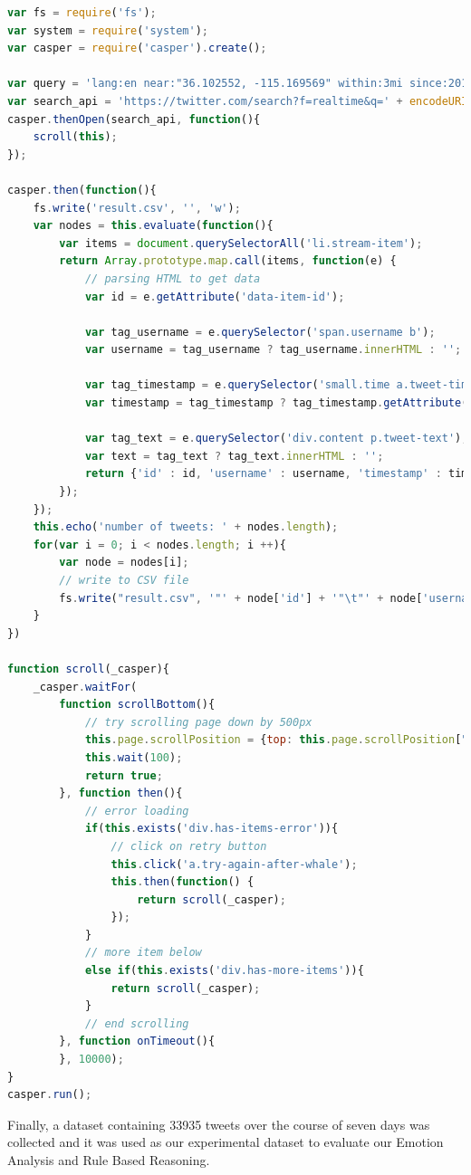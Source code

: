 \clearpage
\begin{lstlisting}[language=JavaScript,caption=Crawling Twitter Advanced Search with CasperJS,label=lst:crawler]
var fs = require('fs');
var system = require('system');
var casper = require('casper').create();

var query = 'lang:en near:"36.102552, -115.169569" within:3mi since:2014-05-01 until:2014-05-07';
var search_api = 'https://twitter.com/search?f=realtime&q=' + encodeURIComponent(query) + '&src=typd';
casper.thenOpen(search_api, function(){
	scroll(this);
});

casper.then(function(){
	fs.write('result.csv', '', 'w');
	var nodes = this.evaluate(function(){
		var items = document.querySelectorAll('li.stream-item');
		return Array.prototype.map.call(items, function(e) {
			// parsing HTML to get data
			var id = e.getAttribute('data-item-id');
			
			var tag_username = e.querySelector('span.username b');
			var username = tag_username ? tag_username.innerHTML : '';
			
			var tag_timestamp = e.querySelector('small.time a.tweet-timestamp span'); 
			var timestamp = tag_timestamp ? tag_timestamp.getAttribute('data-time-ms') : '';
			
			var tag_text = e.querySelector('div.content p.tweet-text');
			var text = tag_text ? tag_text.innerHTML : '';
			return {'id' : id, 'username' : username, 'timestamp' : timestamp, 'text' : text};
		});		
	});
	this.echo('number of tweets: ' + nodes.length);
	for(var i = 0; i < nodes.length; i ++){
		var node = nodes[i];
		// write to CSV file
		fs.write("result.csv", '"' + node['id'] + '"\t"' + node['username'] + '"\t"' + node['timestamp'] + '"\t"' + node['text'] + '"\r\n', 'a');	
	}		
})

function scroll(_casper){
	_casper.waitFor(
		function scrollBottom(){
			// try scrolling page down by 500px
			this.page.scrollPosition = {top: this.page.scrollPosition["top"] + 500, left: 0};
			this.wait(100);
			return true;
		}, function then(){
			// error loading
			if(this.exists('div.has-items-error')){
				// click on retry button
				this.click('a.try-again-after-whale');
				this.then(function() {
					return scroll(_casper);
				});
			}
			// more item below 
			else if(this.exists('div.has-more-items')){
				return scroll(_casper);
			}
			// end scrolling
		}, function onTimeout(){
		}, 10000);
}
casper.run();
\end{lstlisting}

Finally, a dataset containing 33935 tweets over the course of seven days was collected and it was used as our experimental dataset to evaluate our Emotion Analysis and Rule Based Reasoning.

